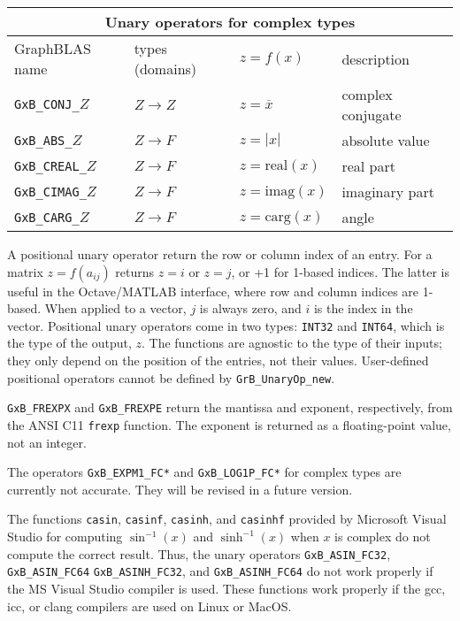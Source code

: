 \documentclass[12pt]{article}
\begin{document}
{{\begin{tabular}{|llll|}
\hline
\multicolumn{4}{|c|}{Unary operators for complex types} \\
\hline
GraphBLAS name          & types (domains)   & $z=f(x)$      & description \\
\hline
\verb'GxB_CONJ_'$Z$    & $Z \rightarrow Z$ & $z = \overline{x}$     & complex conjugate \\
\verb'GxB_ABS_'$Z$     & $Z \rightarrow F$ & $z = |x|$              & absolute value \\
\verb'GxB_CREAL_'$Z$   & $Z \rightarrow F$ & $z = \mbox{real}(x)$   & real part \\
\verb'GxB_CIMAG_'$Z$   & $Z \rightarrow F$ & $z = \mbox{imag}(x)$   & imaginary part \\
\verb'GxB_CARG_'$Z$    & $Z \rightarrow F$ & $z = \mbox{carg}(x)$   & angle \\
\hline
\end{tabular}
}
\vspace{0.2in}

A positional unary operator return the row or column index of an entry.  For a
matrix $z=f(a_{ij})$ returns $z = i$ or $z = j$, or +1 for 1-based indices.
The latter is useful in the Octave/MATLAB interface, where row and column indices are
1-based.  When applied to a vector, $j$ is always zero, and $i$ is the index in
the vector.  Positional unary operators come in two types: \verb'INT32' and
\verb'INT64', which is the type of the output, $z$.  The functions are agnostic
to the type of their inputs; they only depend on the position of the entries,
not their values.
User-defined positional operators cannot be defined by \verb'GrB_UnaryOp_new'.

\verb'GxB_FREXPX' and \verb'GxB_FREXPE' return the mantissa and exponent,
respectively, from the ANSI C11 \verb'frexp' function.  The exponent is
returned as a floating-point value, not an integer.

The operators \verb'GxB_EXPM1_FC*' and \verb'GxB_LOG1P_FC*' for complex
types are currently not accurate.  They will be revised in a future version.

The functions \verb'casin', \verb'casinf', \verb'casinh', and \verb'casinhf'
provided by Microsoft Visual Studio for computing $\sin^{-1}(x)$ and
$\sinh^{-1}(x)$ when $x$ is complex do not compute the correct result.  Thus,
the unary operators \verb'GxB_ASIN_FC32', \verb'GxB_ASIN_FC64'
\verb'GxB_ASINH_FC32', and \verb'GxB_ASINH_FC64' do not work properly if the MS
Visual Studio compiler is used.  These functions work properly if the gcc, icc,
or clang compilers are used on Linux or MacOS.

}
\end{document}
